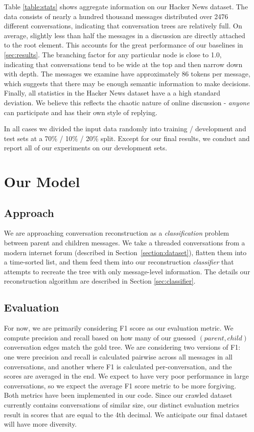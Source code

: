\documentclass[10pt]{article}
\begin{document}
Table \ref{table:stats} shows aggregate information on our Hacker News
dataset. The data consists of nearly a hundred thousand messages distributed
over 2476 different conversations, indicating that conversation trees 
are relatively full. On average, slightly less than half the messages
in a discussion are directly attached to the root element. This accounts
for the great performance of our baselines in \ref{sec:results}. 
The branching factor for any particular node is close to 1.0, indicating
that conversations tend to be wide at the top and then narrow down with
depth. The messages we examine have approximately 86 tokens per message,
which suggests that there may be enough semantic information to make
decisions. Finally, all statistics in the Hacker News dataset have a
a high standard deviation. We believe this reflects the chaotic nature of
online discussion - \textit{anyone} can participate and has their own
style of replying.

In all cases we divided the input data randomly into training / development
and test sets at a 70\% / 10\% / 20\% split. Except for our final results, we
conduct and report all of our experiments on our development sets.

\section{Our Model}
\subsection{Approach}
\label{sec:approach}
We are approaching conversation reconstruction as a \textit{classification} problem
between parent and children messages. We take a threaded conversations from a modern internet forum 
(described in Section~\ref{section:dataset}), flatten them into a time-sorted list, and them feed
them into our reconstruction \textit{classifier} that attempts to recreate the tree
with only message-level information. The details our reconstruction algorithm are 
described in Section \ref{sec:classifier}.

\subsection{Evaluation}
For now, we are primarily considering F1 score as our evaluation metric. We
compute precision and recall based on how many of our guessed 
$(parent,child)$ conversation edges match the gold tree. We are considering 
two versions of F1: one were precision and recall is calculated pairwise 
across all messages in all conversations, and another where F1 is calculated 
per-conversation, and the scores are averaged in the end. We expect to have 
very poor performance  in large conversations, so we expect the average F1
score metric to be more forgiving. Both metrics have been implemented in our 
code. Since our crawled dataset currently contains conversations of similar 
size, our distinct evaluation metrics result in scores that are equal to the 
4th decimal. We anticipate our final dataset will have more diversity.
\end{document}

